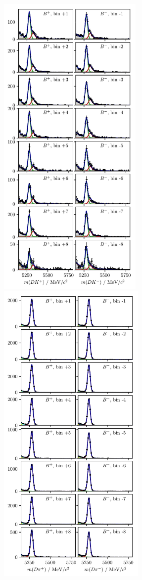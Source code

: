\begin{figure}[tp]
    \centering
    \includegraphics[height=6in]{figures/analysis/bin_by_bin/pretty_fit_bins_dk_DD_2.pdf}
    \includegraphics[height=6in]{figures/analysis/bin_by_bin/pretty_fit_bins_dpi_DD_2.pdf}

\end{figure}
